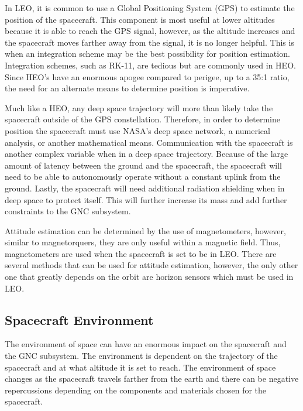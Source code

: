 In LEO, it is common to use a Global Positioning System (GPS) to
estimate the position of the spacecraft. This component is most useful
at lower altitudes because it is able to reach the GPS signal,
however, as the altitude increases and the spacecraft moves farther
away from the signal, it is no longer helpful. This is when an
integration scheme may be the best possibility for position
estimation. Integration schemes, such as RK-11, are tedious but are
commonly used in HEO. Since HEO’s have an enormous apogee compared to
perigee, up to a 35:1 ratio, the need for an alternate means to
determine position is imperative\cite{cassidis}\cite{qp2}.  

Much like a HEO, any deep space trajectory will more than likely take
the spacecraft outside of the GPS constellation. Therefore, in order
to determine position the spacecraft must use NASA’s deep space
network, a numerical analysis, or another mathematical
means. Communication with the spacecraft is another complex variable
when in a deep space trajectory. Because of the large amount of
latency between the ground and the spacecraft, the spacecraft will
need to be able to autonomously operate without a constant uplink from
the ground. Lastly, the spacecraft will need additional radiation
shielding when in deep space to protect itself. This will further
increase its mass and add further constraints to the GNC subsystem. 

Attitude estimation can be determined by the use of magnetometers,
however, similar to magnetorquers, they are only useful within a
magnetic field. Thus, magnetometers are used when the spacecraft is
set to be in LEO. There are several methods that can be used for
attitude estimation, however, the only other one that greatly depends
on the orbit are horizon sensors which must be used in LEO.

\subsection{Spacecraft Environment}

The environment of space can have an enormous impact on the spacecraft
and the GNC subsystem. The environment is dependent on the trajectory
of the spacecraft and at what altitude it is set to reach. The
environment of space changes as the spacecraft travels farther from
the earth and there can be negative repercussions depending on the
components and materials chosen for the spacecraft.  

